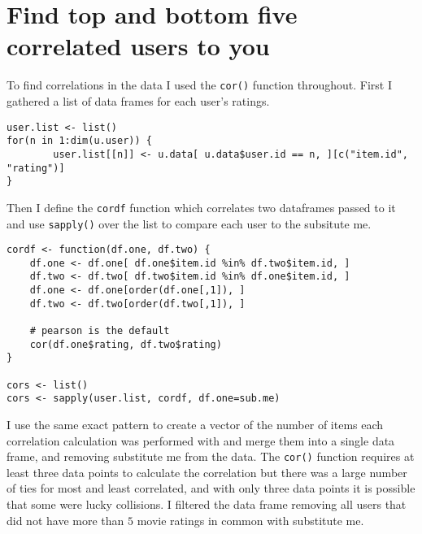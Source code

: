 \documentclass[12pt, a4paper]{article}
\newcommand{\code}[1]{\texttt{#1}}
\begin{document}
\section{Find top and bottom five correlated users to you}

To find correlations in the data I used the \code{cor()} function throughout. First I gathered a list of data frames for each user's ratings.

\begin{minipage}{\linewidth} %
\vspace{2em}
\begin{verbatim}
user.list <- list()
for(n in 1:dim(u.user)) {
        user.list[[n]] <- u.data[ u.data$user.id == n, ][c("item.id", "rating")]
}
\end{verbatim}
\vspace{2em}
\end{minipage}

Then I define the \code{cordf} function which correlates two dataframes passed to it and use \code{sapply()} over the list to compare each user to the subsitute me.

\begin{minipage}{\linewidth} %
\vspace{2em}
\begin{verbatim}
cordf <- function(df.one, df.two) {
    df.one <- df.one[ df.one$item.id %in% df.two$item.id, ]
    df.two <- df.two[ df.two$item.id %in% df.one$item.id, ]
    df.one <- df.one[order(df.one[,1]), ]
    df.two <- df.two[order(df.two[,1]), ]

    # pearson is the default
    cor(df.one$rating, df.two$rating)
}

cors <- list()
cors <- sapply(user.list, cordf, df.one=sub.me)
\end{verbatim}
\vspace{2em}
\end{minipage}

\newpage
I use the same exact pattern to create a vector of the number of items each correlation calculation was performed with and merge them into a single data frame, and removing substitute me from the data. The \code{cor()} function requires at least three data points to calculate the correlation but there was a large number of ties for most and least correlated, and with only three data points it is possible that some were lucky collisions. I filtered the data frame removing all users that did not have more than $5$ movie ratings in common with substitute me.
\end{document}
